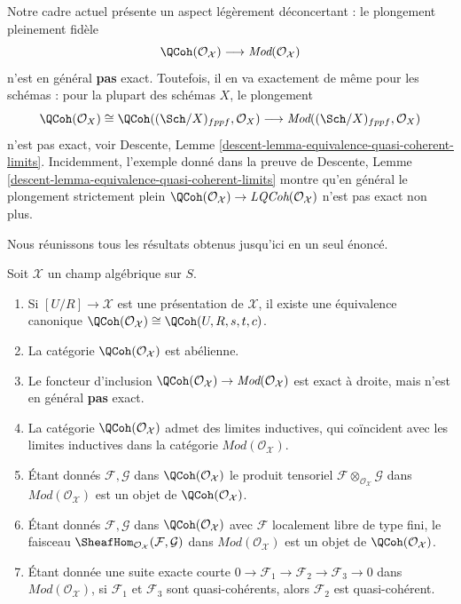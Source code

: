 \medskip\noindent
Notre cadre actuel présente un aspect légèrement déconcertant :
le plongement pleinement fidèle
$$
\QCoh(\mathcal{O}_\mathcal{X})
\longrightarrow
\textit{Mod}(\mathcal{O}_\mathcal{X})
$$
n'est en général {\bf pas} exact. Toutefois, il en va exactement de même
pour les schémas : pour la plupart des schémas $X$, le plongement
$$
\QCoh(\mathcal{O}_X) \cong
\QCoh((\Sch/X)_{fppf}, \mathcal{O}_X) \longrightarrow
\textit{Mod}((\Sch/X)_{fppf}, \mathcal{O}_X)
$$
n'est pas exact, voir
Descente, Lemme \ref{descent-lemma-equivalence-quasi-coherent-limits}.
Incidemment, l'exemple donné dans la preuve de
Descente, Lemme \ref{descent-lemma-equivalence-quasi-coherent-limits}
montre qu'en général le plongement strictement plein
$\QCoh(\mathcal{O}_\mathcal{X}) \to
\textit{LQCoh}(\mathcal{O}_\mathcal{X})$ n'est pas exact non plus.

\medskip\noindent
Nous réunissons tous les résultats obtenus jusqu'ici en un seul énoncé.

\begin{lemma}
\label{lemma-quasi-coherent-algebraic-stack}
Soit $\mathcal{X}$ un champ algébrique sur $S$.
\begin{enumerate}
\item Si $[U/R] \to \mathcal{X}$ est une présentation de $\mathcal{X}$,
il existe une équivalence canonique
$\QCoh(\mathcal{O}_\mathcal{X}) \cong
\QCoh(U, R, s, t, c)$.
\item La catégorie $\QCoh(\mathcal{O}_\mathcal{X})$ est abélienne.
\item Le foncteur d'inclusion $\QCoh(\mathcal{O}_\mathcal{X}) \to
\textit{Mod}(\mathcal{O}_\mathcal{X})$ est exact à droite, mais
n'est en général {\bf pas} exact.
\item La catégorie $\QCoh(\mathcal{O}_\mathcal{X})$
admet des limites inductives, qui coïncident avec les limites inductives dans la catégorie
$\textit{Mod}(\mathcal{O}_\mathcal{X})$.
\item Étant donnés $\mathcal{F}, \mathcal{G}$ dans
$\QCoh(\mathcal{O}_\mathcal{X})$
le produit tensoriel $\mathcal{F} \otimes_{\mathcal{O}_\mathcal{X}} \mathcal{G}$
dans $\textit{Mod}(\mathcal{O}_\mathcal{X})$
est un objet de $\QCoh(\mathcal{O}_\mathcal{X})$.
\item Étant donnés $\mathcal{F}, \mathcal{G}$ dans
$\QCoh(\mathcal{O}_\mathcal{X})$
avec $\mathcal{F}$ localement libre de type fini, le faisceau
$\SheafHom_{\mathcal{O}_\mathcal{X}}(\mathcal{F}, \mathcal{G})$
dans $\textit{Mod}(\mathcal{O}_\mathcal{X})$
est un objet de $\QCoh(\mathcal{O}_\mathcal{X})$.
\item Étant donnée une suite exacte courte
$0 \to \mathcal{F}_1 \to \mathcal{F}_2 \to \mathcal{F}_3 \to 0$
dans $\textit{Mod}(\mathcal{O}_\mathcal{X})$,
si $\mathcal{F}_1$ et $\mathcal{F}_3$ sont quasi-cohérents, alors
$\mathcal{F}_2$ est quasi-cohérent.
\end{enumerate}
\end{lemma}

